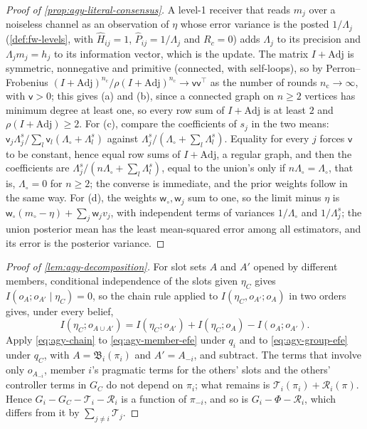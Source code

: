 \begin{proof}[Proof of \cref{prop:agy-literal-consensus}]
A level-1 receiver that reads $m_j$ over a noiseless channel as an observation of $\eta$ whose error variance is the posted $1/\Lambda_j$ (\cref{def:fw-levels}, with $\hat H_{ij}=1$, $\hat P_{ij}=1/\Lambda_j$ and $R_c=0$) adds $\Lambda_j$ to its precision and $\Lambda_jm_j=h_j$ to its information vector, which is the update. The matrix $I+\mathrm{Adj}$ is symmetric, nonnegative and primitive (connected, with self-loops), so by Perron--Frobenius $(I+\mathrm{Adj})^{n_{\mathrm c}}/\rho(I+\mathrm{Adj})^{n_{\mathrm c}}\to\mathsf v\mathsf v^\top$ as the number of rounds $n_{\mathrm c}\to\infty$, with $\mathsf v>0$; this gives (a) and (b), since a connected graph on $n\ge2$ vertices has minimum degree at least one, so every row sum of $I+\mathrm{Adj}$ is at least $2$ and $\rho(I+\mathrm{Adj})\ge2$. For (c), compare the coefficients of $s_j$ in the two means: $\mathsf v_j\Lambda^s_j/\sum_l\mathsf v_l(\Lambda_\circ+\Lambda^s_l)$ against $\Lambda^s_j/(\Lambda_\circ+\sum_l\Lambda^s_l)$. Equality for every $j$ forces $\mathsf v$ to be constant, hence equal row sums of $I+\mathrm{Adj}$, a regular graph, and then the coefficients are $\Lambda^s_j/(n\Lambda_\circ+\sum_l\Lambda^s_l)$, equal to the union's only if $n\Lambda_\circ=\Lambda_\circ$, that is, $\Lambda_\circ=0$ for $n\ge2$; the converse is immediate, and the prior weights follow in the same way. For (d), the weights $\mathsf w_\circ,\mathsf w_j$ sum to one, so the limit minus $\eta$ is $\mathsf w_\circ(m_\circ-\eta)+\sum_j\mathsf w_jv_j$, with independent terms of variances $1/\Lambda_\circ$ and $1/\Lambda^s_j$; the union posterior mean has the least mean-squared error among all estimators, and its error is the posterior variance.
\end{proof}

\begin{proof}[Proof of \cref{lem:agy-decomposition}]
For slot sets $A$ and $A'$ opened by different members, conditional independence of the slots given $\eta_C$ gives $I(o_A;o_{A'}\mid\eta_C)=0$, so the chain rule applied to $I(\eta_C,o_{A'};o_A)$ in two orders gives, under every belief,
\begin{equation}\label{eq:agy-chain}
I(\eta_C;o_{A\cup A'})=I(\eta_C;o_{A'})+I(\eta_C;o_A)-I(o_A;o_{A'}).
\end{equation}
Apply \eqref{eq:agy-chain} to \eqref{eq:agy-member-efe} under $q_i$ and to \eqref{eq:agy-group-efe} under $q_C$, with $A=\mathfrak B_i(\pi_i)$ and $A'=A_{-i}$, and subtract. The terms that involve only $o_{A_{-i}}$, member $i$'s pragmatic terms for the others' slots and the others' controller terms in $G_C$ do not depend on $\pi_i$; what remains is $\mathcal T_i(\pi_i)+\mathcal R_i(\pi)$. Hence $G_i-G_C-\mathcal T_i-\mathcal R_i$ is a function of $\pi_{-i}$, and so is $G_i-\Phi-\mathcal R_i$, which differs from it by $\sum_{j\ne i}\mathcal T_j$.
\end{proof}

